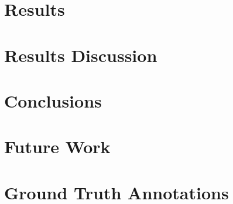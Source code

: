 \documentclass{uvamscse}	%
\begin{document}



\chapter{Results}
\label{results}




\chapter{Results Discussion}




\chapter{Conclusions}
\label{conclusions2}




\chapter{Future Work}




\printbibliography

\appendix
{}


%


\chapter{Ground Truth Annotations}
\label{groundtruth}
\end{document}
